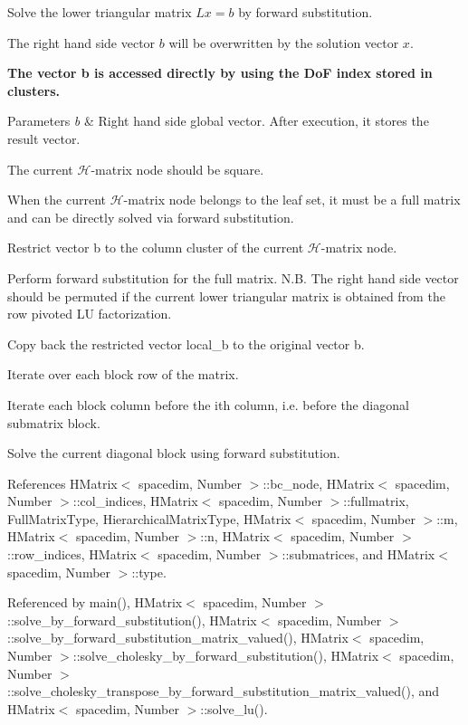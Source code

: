 Solve the lower triangular matrix $Lx=b$ by forward substitution.

The right hand side vector $b$ will be overwritten by the solution vector $x$.

{\bfseries The vector {\ttfamily b} is accessed directly by using the DoF index stored in clusters.}


\begin{DoxyParams}{Parameters}
{\em b} & Right hand side global vector. After execution, it stores the result vector. \\
\hline
\end{DoxyParams}
The current $\mathcal{H}$-\/matrix node should be square.

When the current $\mathcal{H}$-\/matrix node belongs to the leaf set, it must be a full matrix and can be directly solved via forward substitution.

Restrict vector {\ttfamily b} to the column cluster of the current $\mathcal{H}$-\/matrix node.

Perform forward substitution for the full matrix. N.\+B. The right hand side vector should be permuted if the current lower triangular matrix is obtained from the row pivoted LU factorization.

Copy back the restricted vector {\ttfamily local\+\_\+b} to the original vector {\ttfamily b}.

Iterate over each block row of the matrix.

Iterate each block column before the i\textquotesingle{}th column, i.\+e. before the diagonal submatrix block.

Solve the current diagonal block using forward substitution.

References H\+Matrix$<$ spacedim, Number $>$\+::bc\+\_\+node, H\+Matrix$<$ spacedim, Number $>$\+::col\+\_\+indices, H\+Matrix$<$ spacedim, Number $>$\+::fullmatrix, Full\+Matrix\+Type, Hierarchical\+Matrix\+Type, H\+Matrix$<$ spacedim, Number $>$\+::m, H\+Matrix$<$ spacedim, Number $>$\+::n, H\+Matrix$<$ spacedim, Number $>$\+::row\+\_\+indices, H\+Matrix$<$ spacedim, Number $>$\+::submatrices, and H\+Matrix$<$ spacedim, Number $>$\+::type.



Referenced by main(), H\+Matrix$<$ spacedim, Number $>$\+::solve\+\_\+by\+\_\+forward\+\_\+substitution(), H\+Matrix$<$ spacedim, Number $>$\+::solve\+\_\+by\+\_\+forward\+\_\+substitution\+\_\+matrix\+\_\+valued(), H\+Matrix$<$ spacedim, Number $>$\+::solve\+\_\+cholesky\+\_\+by\+\_\+forward\+\_\+substitution(), H\+Matrix$<$ spacedim, Number $>$\+::solve\+\_\+cholesky\+\_\+transpose\+\_\+by\+\_\+forward\+\_\+substitution\+\_\+matrix\+\_\+valued(), and H\+Matrix$<$ spacedim, Number $>$\+::solve\+\_\+lu().

